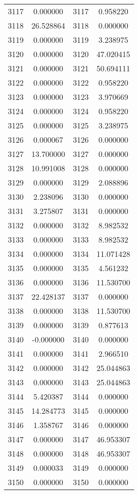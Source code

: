 \documentclass[12pt]{article}
\begin{document}
\begin{longtable}{@{}cccc@{}}
3117 & 0.000000 & 3117 & 0.958220 \\
3118 & 26.528864 & 3118 & 0.000000 \\
3119 & 0.000000 & 3119 & 3.238975 \\
3120 & 0.000000 & 3120 & 47.020415 \\
3121 & 0.000000 & 3121 & 50.694111 \\
3122 & 0.000000 & 3122 & 0.958220 \\
3123 & 0.000000 & 3123 & 3.970669 \\
3124 & 0.000000 & 3124 & 0.958220 \\
3125 & 0.000000 & 3125 & 3.238975 \\
3126 & 0.000067 & 3126 & 0.000000 \\
3127 & 13.700000 & 3127 & 0.000000 \\
3128 & 10.991008 & 3128 & 0.000000 \\
3129 & 0.000000 & 3129 & 2.088896 \\
3130 & 2.238096 & 3130 & 0.000000 \\
3131 & 3.275807 & 3131 & 0.000000 \\
3132 & 0.000000 & 3132 & 8.982532 \\
3133 & 0.000000 & 3133 & 8.982532 \\
3134 & 0.000000 & 3134 & 11.071428 \\
3135 & 0.000000 & 3135 & 4.561232 \\
3136 & 0.000000 & 3136 & 11.530700 \\
3137 & 22.428137 & 3137 & 0.000000 \\
3138 & 0.000000 & 3138 & 11.530700 \\
3139 & 0.000000 & 3139 & 0.877613 \\
3140 & -0.000000 & 3140 & 0.000000 \\
3141 & 0.000000 & 3141 & 2.966510 \\
3142 & 0.000000 & 3142 & 25.044863 \\
3143 & 0.000000 & 3143 & 25.044863 \\
3144 & 5.420387 & 3144 & 0.000000 \\
3145 & 14.284773 & 3145 & 0.000000 \\
3146 & 1.358767 & 3146 & 0.000000 \\
3147 & 0.000000 & 3147 & 46.953307 \\
3148 & 0.000000 & 3148 & 46.953307 \\
3149 & 0.000033 & 3149 & 0.000000 \\
3150 & 0.000000 & 3150 & 0.000000 \\

\end{longtable}
\end{document}
